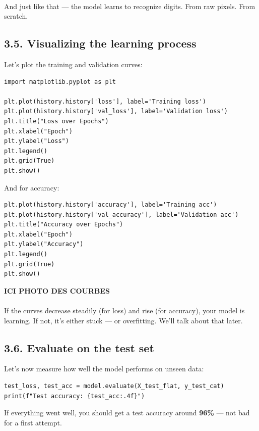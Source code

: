 \documentclass[11pt]{article}
\begin{document}
\paragraph{} And just like that — the model learns to recognize digits. From raw pixels. From scratch.

\subsection*{3.5. Visualizing the learning process}

Let’s plot the training and validation curves:

\begin{verbatim}
import matplotlib.pyplot as plt

plt.plot(history.history['loss'], label='Training loss')
plt.plot(history.history['val_loss'], label='Validation loss')
plt.title("Loss over Epochs")
plt.xlabel("Epoch")
plt.ylabel("Loss")
plt.legend()
plt.grid(True)
plt.show()
\end{verbatim}

And for accuracy:

\begin{verbatim}
plt.plot(history.history['accuracy'], label='Training acc')
plt.plot(history.history['val_accuracy'], label='Validation acc')
plt.title("Accuracy over Epochs")
plt.xlabel("Epoch")
plt.ylabel("Accuracy")
plt.legend()
plt.grid(True)
plt.show()
\end{verbatim}

\textbf{ICI PHOTO DES COURBES}
\paragraph{} If the curves decrease steadily (for loss) and rise (for accuracy), your model is learning. If not, it’s either stuck — or overfitting. We’ll talk about that later.

\subsection*{3.6. Evaluate on the test set}

Let’s now measure how well the model performs on unseen data:

\begin{verbatim}
test_loss, test_acc = model.evaluate(X_test_flat, y_test_cat)
print(f"Test accuracy: {test_acc:.4f}")
\end{verbatim}

If everything went well, you should get a test accuracy around \textbf{96\%} — not bad for a first attempt.
\end{document}
